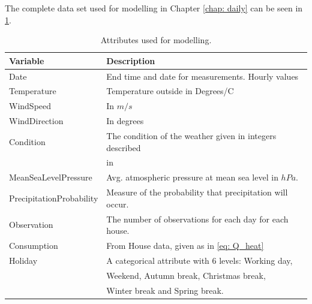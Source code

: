\noindent The complete data set used for modelling in Chapter \ref{chap: daily} can be seen in \cref{tab: modeldata}.
\begin{table}[ht]
    \centering
    \begin{tabular}{ll}
     \hline
     \textbf{Variable} & \textbf{Description} \\
    \hline
    \hline
    Date  &  End time and date for measurements. Hourly values\\
    Temperature  &  Temperature outside in Degrees/C \\
    WindSpeed  &  In $m/s$\\ 
    WindDirection  &  In degrees\\
    Condition  & The condition of the weather given in integers described \\ & in \cite{condition}\\
    MeanSeaLevelPressure & Avg. atmospheric pressure at mean sea level in $hPa$.\\
    PrecipitationProbability & Measure of the probability that precipitation will occur. \\
    Observation & The number of observations for each day for each house.\\
    Consumption & From House data, given as in \cref{eq: Q_heat} \\
    Holiday & A categorical attribute with 6 levels: Working day, \\ & Weekend, Autumn break, Christmas break, \\ & Winter break and Spring break.\\
    \hline
    \end{tabular}
    \caption{Attributes used for modelling.}
    \label{tab: modeldata}
\end{table}   

